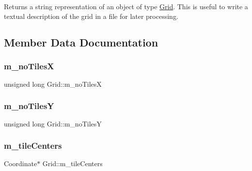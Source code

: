 \begin{DoxyReturn}{Returns}
a string representation of an object of type \hyperlink{class_grid}{Grid}. This is useful to write a textual description of the grid in a file for later processing. 
\end{DoxyReturn}


\subsection{Member Data Documentation}
\mbox{\label{class_grid_a177bfdc70436c25a1510d1abe19e34c1}} 
\subsubsection{\texorpdfstring{m\+\_\+no\+TilesX}{m\_noTilesX}}
{\footnotesize\ttfamily unsigned long Grid\+::m\+\_\+no\+TilesX\hspace{0.3cm}{\ttfamily [private]}}

\mbox{\label{class_grid_a8fe14c4781dfd5623922fcc1f9c10130}} 
\subsubsection{\texorpdfstring{m\+\_\+no\+TilesY}{m\_noTilesY}}
{\footnotesize\ttfamily unsigned long Grid\+::m\+\_\+no\+TilesY\hspace{0.3cm}{\ttfamily [private]}}

\mbox{\label{class_grid_a27b99b13ac7e5bec81f7b8704bc3405a}} 
\subsubsection{\texorpdfstring{m\+\_\+tile\+Centers}{m\_tileCenters}}
{\footnotesize\ttfamily Coordinate$\ast$ Grid\+::m\+\_\+tile\+Centers\hspace{0.3cm}{\ttfamily [private]}}

\mbox{\label{class_grid_ae109d428ac5489815748e92fdde1b91f}} 
